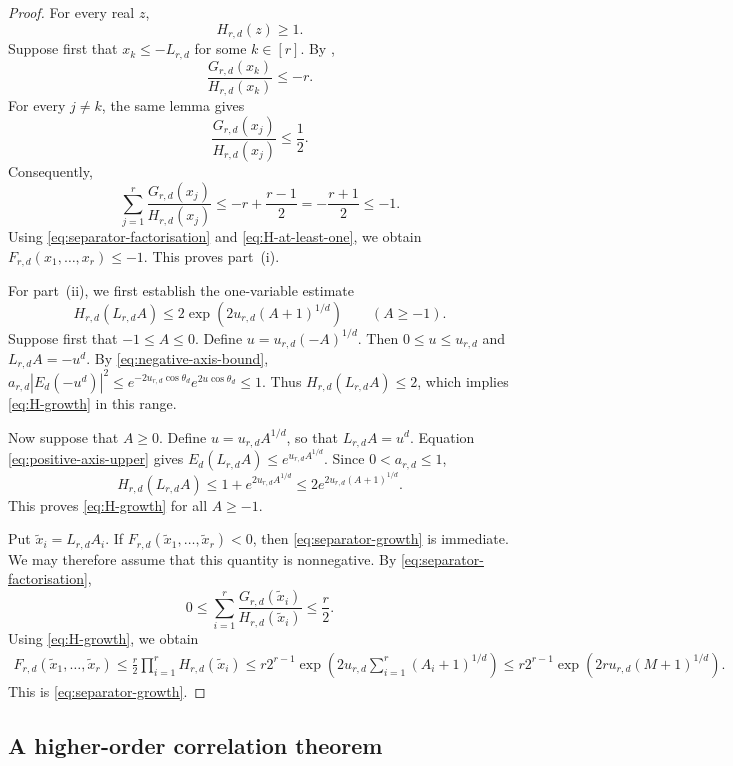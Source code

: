 \documentclass[twoside,12pt]{article}
\theoremstyle{definition}
\theoremstyle{remark}
\newcommand{\1}{\mathbf 1}
\begin{document}
\begin{proof}
For every real $z$,
\begin{equation}\label{eq:H-at-least-one}
 H_{r,d}(z)\ge1.
\end{equation}
Suppose first that $x_k\le-L_{r,d}$ for some $k\in[r]$. By
,
\[
 \frac{G_{r,d}(x_k)}{H_{r,d}(x_k)}\le-r.
\]
For every $j\ne k$, the same lemma gives
\[
 \frac{G_{r,d}(x_j)}{H_{r,d}(x_j)}\le\frac12.
\]
Consequently,
\[
 \sum_{j=1}^r\frac{G_{r,d}(x_j)}{H_{r,d}(x_j)}
 \le-r+\frac{r-1}{2}=-\frac{r+1}{2}\le-1.
\]
Using \eqref{eq:separator-factorisation} and
\eqref{eq:H-at-least-one}, we obtain
$
 F_{r,d}(x_1,\ldots,x_r)\le-1.
$
This proves part~\textup{(i)}.

For part~\textup{(ii)}, we first establish the one-variable estimate
\begin{equation}\label{eq:H-growth}
 H_{r,d}(L_{r,d}A)
 \le2\exp\!\left(2u_{r,d}(A+1)^{1/d}\right)
 \qquad(A\ge-1).
\end{equation}
Suppose first that $-1\le A\le0$. Define
$u=u_{r,d}(-A)^{1/d}$. Then $0\le u\le u_{r,d}$ and
$L_{r,d}A=-u^d$. By \eqref{eq:negative-axis-bound},
$
 a_{r,d}|E_d(-u^d)|^2
 \le e^{-2u_{r,d}\cos\theta_d}e^{2u\cos\theta_d}\le1.
$
Thus $H_{r,d}(L_{r,d}A)\le2$, which implies
\eqref{eq:H-growth} in this range.

Now suppose that $A\ge0$. Define $u=u_{r,d}A^{1/d}$, so that
$L_{r,d}A=u^d$. Equation \eqref{eq:positive-axis-upper} gives
$
 E_d(L_{r,d}A)\le e^{u_{r,d}A^{1/d}}.
$
Since $0<a_{r,d}\le1$,
\[
 H_{r,d}(L_{r,d}A)
 \le1+e^{2u_{r,d}A^{1/d}}
 \le2e^{2u_{r,d}(A+1)^{1/d}}.
\]
This proves \eqref{eq:H-growth} for all $A\ge-1$.

Put $\widetilde x_i=L_{r,d}A_i$. If
$F_{r,d}(\widetilde x_1,\ldots,\widetilde x_r)<0$, then
\eqref{eq:separator-growth} is immediate. We may therefore assume that this
quantity is nonnegative. By \eqref{eq:separator-factorisation},
\[
 0\le\sum_{i=1}^r
 \frac{G_{r,d}(\widetilde x_i)}{H_{r,d}(\widetilde x_i)}
 \le\frac r2.
\]
Using \eqref{eq:H-growth}, we obtain
\begin{align*}
 F_{r,d}(\widetilde x_1,\ldots,\widetilde x_r)
 \le\frac r2\prod_{i=1}^rH_{r,d}(\widetilde x_i)\le r2^{r-1}\exp\!\left(
2u_{r,d}\sum_{i=1}^r(A_i+1)^{1/d}\right)\le r2^{r-1}\exp\!\left(2ru_{r,d}(M+1)^{1/d}\right).
\end{align*}
This is \eqref{eq:separator-growth}.
\end{proof}

\subsection{A higher-order correlation theorem}\label{sec:correlation}
\end{document}
